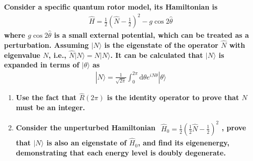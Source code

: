 \documentclass[../../main.tex]{subfiles}
\begin{document}
\textbf{Consider a specific quantum rotor model, its Hamiltonian is 
\begin{align*}
  \hat{H} = \frac{1}{2}\left(\hat{N} - \frac{1}{2}\right)^{2} - g\cos{2\hat{\theta}}
\end{align*}
where $g\cos{2\hat{\theta}}$ is a small external potential, which can be treated as a perturbation. Assuming $|N\rangle$ is the eigenstate of the operator $\hat{N}$ with eigenvalue $N$, i.e., $\hat{N}|N\rangle = N|N\rangle$. It can be calculated that $|N\rangle$ is expanded in terms of $|\theta\rangle$ as 
\begin{align*}
  |N\rangle = \frac{1}{\sqrt{2\pi}}\int_{0}^{2\pi}\mathrm{d}\theta e^{iN\theta}|\theta\rangle
\end{align*}}
\begin{enumerate}
  \item \textbf{Use the fact that $\hat{R}(2\pi)$ is the identity operator to prove that $N$ must be an integer.}
  
{}
  
  \item  \textbf{Consider the unperturbed Hamiltonian $\begin{aligned}
    \hat{H}_{0} = \frac{1}{2}\left(\frac{1}{2}\hat{N} - \frac{1}{2}\right)^{2}
  \end{aligned}$, prove that $|N\rangle$ is also an eigenstate of $\hat{H}_{0}$, and find its eigenenergy, demonstrating that each energy level is doubly degenerate.}
{}


\end{enumerate}
\end{document}
